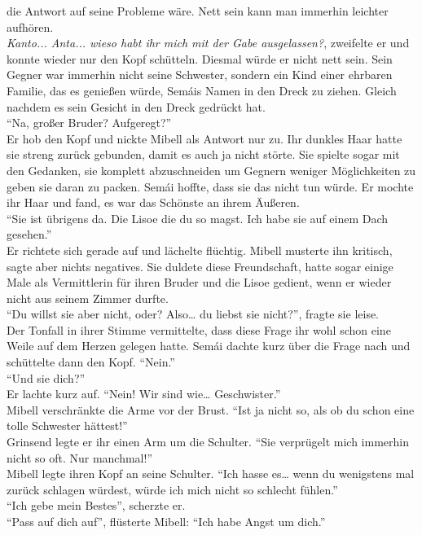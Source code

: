 die Antwort auf seine Probleme wäre. Nett sein kann man immerhin leichter aufhören.\\
\textit{Kanto... Anta... wieso habt ihr mich mit der Gabe ausgelassen?}, zweifelte er 
und konnte wieder nur den Kopf schütteln. Diesmal würde er nicht nett sein. Sein Gegner war 
immerhin nicht seine Schwester, sondern ein Kind einer ehrbaren Familie, das es genießen würde, 
Semáis Namen in den Dreck zu ziehen. Gleich nachdem es sein Gesicht in den Dreck gedrückt hat. \\
``Na, großer Bruder? Aufgeregt?''\\
Er hob den Kopf und nickte Mibell als Antwort nur zu. Ihr dunkles Haar hatte sie streng 
zurück gebunden, damit es auch ja nicht störte. Sie spielte sogar mit den Gedanken, sie komplett 
abzuschneiden um Gegnern weniger Möglichkeiten zu geben sie daran zu packen. Semái hoffte, dass sie 
das nicht tun würde. Er mochte ihr Haar und fand, es war das Schönste an ihrem Äußeren. \\
``Sie ist übrigens da. Die Lisoe die du so magst. Ich habe sie auf einem Dach gesehen.''\\
Er richtete sich gerade auf und lächelte flüchtig. Mibell musterte ihn kritisch, sagte aber nichts 
negatives. Sie duldete diese Freundschaft, hatte sogar einige Male als Vermittlerin für ihren 
Bruder und die Lisoe gedient, wenn er wieder nicht aus seinem Zimmer durfte.\\
``Du willst sie aber nicht, oder? Also… du liebst sie nicht?'', fragte sie leise.\\
Der Tonfall in ihrer Stimme vermittelte, dass diese Frage ihr wohl schon eine Weile auf dem Herzen 
gelegen hatte. Semái dachte kurz über die Frage nach und schüttelte dann den Kopf. ``Nein.''\\
``Und sie dich?''\\
Er lachte kurz auf. ``Nein! Wir sind wie… Geschwister.''\\
Mibell verschränkte die Arme vor der Brust. ``Ist ja nicht so, als ob du schon eine tolle Schwester 
hättest!''\\
Grinsend legte er ihr einen Arm um die Schulter. ``Sie verprügelt mich immerhin nicht so oft. Nur 
manchmal!''\\
Mibell legte ihren Kopf an seine Schulter. ``Ich hasse es… wenn du wenigstens mal zurück schlagen 
würdest, würde ich mich nicht so schlecht fühlen.''\\
``Ich gebe mein Bestes'', scherzte er. \\
``Pass auf dich auf'', flüsterte Mibell: ``Ich habe Angst um dich.''\\
